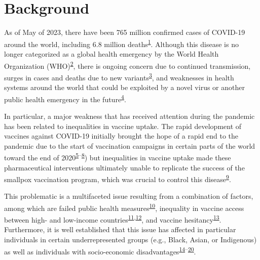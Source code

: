 \documentclass[
]{article}
\begin{document}
\hypertarget{background}{%
\section{Background}\label{background}}

As of May of 2023, there have been 765 million confirmed cases of
COVID-19 around the world, including 6.8 million
deaths\textsuperscript{\protect\hyperlink{ref-WHO-Covid}{1}}. Although
this disease is no longer categorized as a global health emergency by
the World Health Organization
(WHO)\textsuperscript{\protect\hyperlink{ref-rigby2023}{2}}, there is
ongoing concern due to continued transmission, surges in cases and
deaths due to new
variants\textsuperscript{\protect\hyperlink{ref-un2023}{3}}, and
weaknesses in health systems around the world that could be exploited by
a novel virus or another public health emergency in the
future\textsuperscript{\protect\hyperlink{ref-mackey2021}{4}}.

In particular, a major weakness that has received attention during the
pandemic has been related to inequalities in vaccine uptake. The rapid
development of vaccines against COVID-19 initially brought the hope of a
rapid end to the pandemic due to the start of vaccination campaigns in
certain parts of the world toward the end of
2020\textsuperscript{\protect\hyperlink{ref-thelancet2021}{5}--\protect\hyperlink{ref-tanne2020}{8}})
but inequalities in vaccine uptake made these pharmaceutical
interventions ultimately unable to replicate the success of the smallpox
vaccination program, which was crucial to control this
disease\textsuperscript{\protect\hyperlink{ref-kayser2021}{9}}.

This problematic is a multifaceted issue resulting from a combination of
factors, among which are failed public health
measures\textsuperscript{\protect\hyperlink{ref-li2021}{10}}, inequality
in vaccine access between high- and low-income
countries\textsuperscript{\protect\hyperlink{ref-gerretsen2021}{11},\protect\hyperlink{ref-tamey2022}{12}},
and vaccine
hesitancy\textsuperscript{\protect\hyperlink{ref-nafilyan2021}{13}}.
Furthermore, it is well established that this issue has affected in
particular individuals in certain underrepresented groups (e.g., Black,
Asian, or Indigenous) as well as individuals with socio-economic
disadvantages\textsuperscript{\protect\hyperlink{ref-willis2021}{14}--\protect\hyperlink{ref-hussain2022}{20}}.
\end{document}
